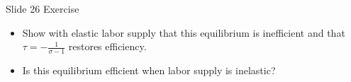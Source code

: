 Slide 26 Exercise

\begin{itemize}
  \item Show with elastic labor supply that this equilibrium is inefficient and that $\tau=-\frac{1}{\sigma-1}$ restores efficiency.
  \item Is this equilibrium efficient when labor supply is inelastic?
\end{itemize}
